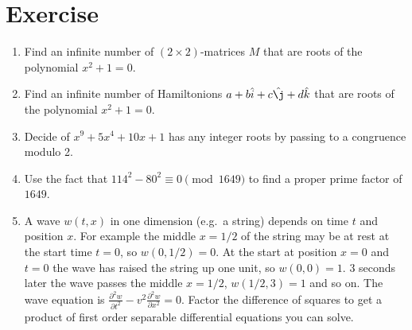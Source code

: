 

\section*{Exercise}
\begin{enumerate}
    \item Find an infinite number of $(2\times 2)$-matrices $M$ 
    that are roots of the polynomial $x^2+1=0$.
    \item Find an infinite number of Hamiltonions $a+b\hat{i}+c\hat{\j}+d\hat{k}$
    that are roots of the polynomial $x^2+1=0$.
    \item Decide of $x^9+5x^4+10x+1$ has any integer roots by passing to a congruence modulo 
    2.
    \item Use the fact that $114^2-80^2\equiv 0 \pmod{1649}$ to find a proper prime 
    factor of $1649$.  

    \item A wave $w(t,x)$ in one dimension (e.g.\ a string) depends on time $t$ and position $x$.
    For example the middle $x=1/2$ of the string may be at rest at the start time $t=0$, so 
    $w(0,1/2)=0$.  At the start at position $x=0$ and $t=0$ the wave has raised the string up 
    one unit, so $w(0,0)=1$.  3 seconds later the wave passes the middle $x=1/2$,
    $w(1/2,3)=1$ and so on.  The wave equation is $\frac{\partial^2 w}{\partial t^2}-v^2\frac{\partial^2 w}{\partial x^2}=0$.
    Factor the difference of squares to get a product of first order separable differential equations 
    you can solve.
\end{enumerate}